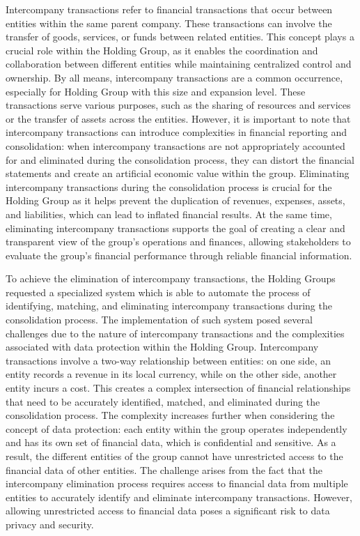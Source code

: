 \documentclass[12pt,a4paper,openright,twoside]{book}
\begin{document}
Intercompany transactions refer to financial transactions that occur between entities within the same parent company. 
%
These transactions can involve the transfer of goods, services, or funds between related entities.
%
This concept plays a crucial role within the Holding Group, as it enables the coordination and collaboration between different entities while maintaining centralized control and ownership.
%
By all means, intercompany transactions are a common occurrence, especially for Holding Group with this size and expansion level.
%
These transactions serve various purposes, such as the sharing of resources and services or the transfer of assets across the entities. 
%
However, it is important to note that intercompany transactions can introduce complexities in financial reporting and consolidation: when intercompany transactions are not appropriately accounted for and eliminated during the consolidation process, they can distort the financial statements and create an artificial economic value within the group.
%
Eliminating intercompany transactions during the consolidation process is crucial for the Holding Group as it helps prevent the duplication of revenues, expenses, assets, and liabilities, which can lead to inflated financial results.
%
At the same time, eliminating intercompany transactions supports the goal of creating a clear and transparent view of the group's operations and finances, allowing stakeholders to evaluate the group's financial performance through reliable financial information.

To achieve the elimination of intercompany transactions, the Holding Groups requested a specialized system which is able to automate the process of identifying, matching, and eliminating intercompany transactions during the consolidation process.
%
The implementation of such system posed several challenges due to the nature of intercompany transactions and the complexities associated with data protection within the Holding Group.
%
Intercompany transactions involve a two-way relationship between entities: on one side, an entity records a revenue in its local currency, while on the other side, another entity incurs a cost. 
%
This creates a complex intersection of financial relationships that need to be accurately identified, matched, and eliminated during the consolidation process.
%
The complexity increases further when considering the concept of data protection: each entity within the group operates independently and has its own set of financial data, which is confidential and sensitive. 
%
As a result, the different entities of the group cannot have unrestricted access to the financial data of other entities.
%
The challenge arises from the fact that the intercompany elimination process requires access to financial data from multiple entities to accurately identify and eliminate intercompany transactions.
%
However, allowing unrestricted access to financial data poses a significant risk to data privacy and security.
\end{document}
